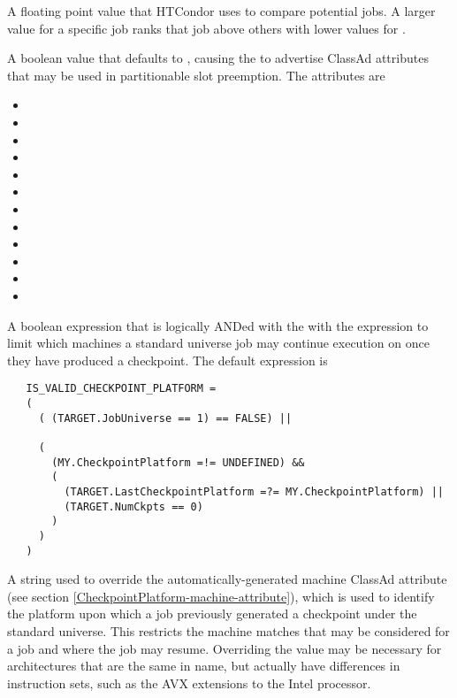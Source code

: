 \begin{description}
\label{param:Rank}
\item[\Macro{RANK}]
  A floating point value that HTCondor uses to compare potential jobs.
  A larger value for a specific job ranks that job above
  others with lower values for .

\label{param:AdvertisePslotRollupInformation}
\item[\Macro{ADVERTISE\_PSLOT\_ROLLUP\_INFORMATION}]
  A boolean value that defaults to ,
  causing the  to advertise ClassAd attributes that may be
  used in partitionable slot preemption.
  The attributes are
  \begin{itemize}
  \item {}
  \item {}
  \item {}
  \item {}
  \item {}
  \item {}
  \item {}
  \item {}
  \item {}
  \item {}
  \item {}
  \item {}
  \end{itemize}

\label{param:IsValidCheckpointPlatform}
\item[\Macro{IS\_VALID\_CHECKPOINT\_PLATFORM}]
  A boolean expression that is logically ANDed with the
  with the  expression to limit which machines a
  standard universe job may continue execution on once they have
  produced a checkpoint.
  The default expression is

   \footnotesize
   \begin{verbatim}
   IS_VALID_CHECKPOINT_PLATFORM =
   (
     ( (TARGET.JobUniverse == 1) == FALSE) ||
   
     (
       (MY.CheckpointPlatform =!= UNDEFINED) &&
       (
         (TARGET.LastCheckpointPlatform =?= MY.CheckpointPlatform) ||
         (TARGET.NumCkpts == 0)
       )
     )
   )
   \end{verbatim}
   \normalsize

\label{param:CheckpointPlatform}
\item[\Macro{CHECKPOINT\_PLATFORM}]
  A string used to
  override the automatically-generated machine ClassAd attribute 
   (see section
  \ref{CheckpointPlatform-machine-attribute}),
  which is used to identify the platform upon which a job previously generated
  a checkpoint under the standard universe.
  This restricts the machine matches that may be considered for a job
  and where the job may resume.
  Overriding the value may be necessary for architectures that are
  the same in name, but actually have differences in instruction sets,
  such as the AVX extensions to the Intel processor.


\end{description}
